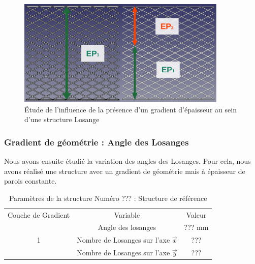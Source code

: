 \documentclass[a4paper]{article}
\begin{document}
	\begin{figure}[H]
		\centering
		\includegraphics[width=10cm]{Images/6/gradep/gradep.pdf}
		\caption{Étude de l’influence de la présence d'un gradient d'épaisseur au sein d'une structure Losange}
		\label{grad_ep}
	\end{figure}
	\newpage
	
	\subsubsection{Gradient de géométrie : Angle des Losanges}
	\hspace{0.5cm}Nous avons ensuite étudié la variation des angles des Losanges. Pour cela, nous avons réalisé une structure avec un gradient de géométrie mais à épaisseur de parois constante.
	
	\begin{table}[H]
		\centering
		\begin{tabular}{|c|c|c|}
			\hline
			\rowcolor{Gray}
			\multicolumn{3}{c}{Structure de Référence}\\\hline
			\rowcolor{Gray}
			Couche de Gradient & Variable & Valeur\\
			\hline\hline
			& \textcolor[rgb]{0,0.5,0}{Angle des losanges} & \textcolor[rgb]{0,0.5,0}{??? mm}\\
			\textcolor[rgb]{0,0.5,0}{1} & \textcolor[rgb]{0,0.5,0}{Nombre de Losanges sur l'axe $\vec{x}$} & \textcolor[rgb]{0,0.5,0}{???}\\
			& \textcolor[rgb]{0,0.5,0}{Nombre de Losanges sur l'axe $\vec{y}$} & \textcolor[rgb]{0,0.5,0}{???}\\
			\hline
		\end{tabular}
		\caption{Paramètres de la structure Numéro ??? : Structure de référence}
	\end{table}
	
\end{document}

